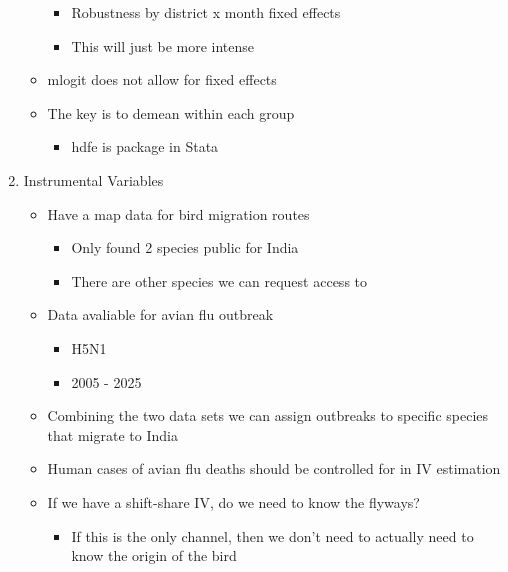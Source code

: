 \documentclass[
  letterpaper,
]{article}
\providecommand{\tightlist}{%
  \setlength{\itemsep}{0pt}\setlength{\parskip}{0pt}}\usepackage{longtable,booktabs,array}
\begin{document}
\begin{tcolorbox}
\begin{enumerate}
\begin{itemize}
    \begin{itemize}
    \tightlist
    \item
      Robustness by district x month fixed effects
    \item
      This will just be more intense
    \end{itemize}
  \item
    mlogit does not allow for fixed effects
  \item
    The key is to demean within each group

    \begin{itemize}
    \tightlist
    \item
      hdfe is package in Stata
    \end{itemize}
  \end{itemize}
\item
  Instrumental Variables

  \begin{itemize}
  \tightlist
  \item
    Have a map data for bird migration routes

    \begin{itemize}
    \tightlist
    \item
      Only found 2 species public for India
    \item
      There are other species we can request access to
    \end{itemize}
  \item
    Data avaliable for avian flu outbreak

    \begin{itemize}
    \tightlist
    \item
      H5N1
    \item
      2005 - 2025
    \end{itemize}
  \item
    Combining the two data sets we can assign outbreaks to specific
    species that migrate to India
  \item
    Human cases of avian flu deaths should be controlled for in IV
    estimation
  \item
    If we have a shift-share IV, do we need to know the flyways?

    \begin{itemize}
    \tightlist
    \item
      If this is the only channel, then we don't need to actually need
      to know the origin of the bird
    \end{itemize}
  \end{itemize}
\end{enumerate}


\end{tcolorbox}
\end{document}
